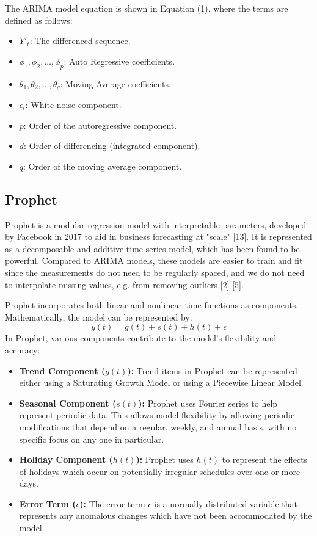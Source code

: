 \documentclass[conference]{IEEEtran}
\begin{document}
The ARIMA model equation is shown in Equation (1), where the terms are defined as follows:
\begin{itemize}
  \item $Y'_t$: The differenced sequence.
  \item $\phi_1, \phi_2, \ldots, \phi_p$: Auto Regressive coefficients.
  \item $\theta_1, \theta_2, \ldots, \theta_q$: Moving Average coefficients.
  \item $\epsilon_t$: White noise component.
  \item $p$: Order of the autoregressive component.
  \item $d$: Order of differencing (integrated component).
  \item $q$: Order of the moving average component.
\end{itemize}

\subsection{Prophet}
Prophet is a modular regression model with interpretable parameters, developed by Facebook in 2017 to aid in business forecasting at "scale" [13]. It is represented as a decomposable and additive time series model, which has been found to be powerful. Compared to ARIMA models, these models are easier to train and fit since the measurements do not need to be regularly spaced, and we do not need to interpolate missing values, e.g. from removing outliers [2]-[5].

Prophet incorporates both linear and nonlinear time functions as components. Mathematically, the model can be represented by:
\begin{equation}
  y(t) = g(t) + s(t) + h(t) + \epsilon
\end{equation} 
In Prophet, various components contribute to the model's flexibility and accuracy:

\begin{itemize}
  \item \textbf{Trend Component ($g(t)$):} Trend items in Prophet can be represented either using a Saturating Growth Model or using a Piecewise Linear Model.
  
  \item \textbf{Seasonal Component ($s(t)$):} Prophet uses Fourier series to help represent periodic data. This allows model flexibility by allowing periodic modifications that depend on a regular, weekly, and annual basis, with no specific focus on any one in particular.
  
  \item \textbf{Holiday Component ($h(t)$):} Prophet uses $h(t)$ to represent the effects of holidays which occur on potentially irregular schedules over one or more days.
  
  \item \textbf{Error Term ($\epsilon$):} The error term $\epsilon$ is a normally distributed variable that represents any anomalous changes which have not been accommodated by the model.
\end{itemize}
\end{document}
